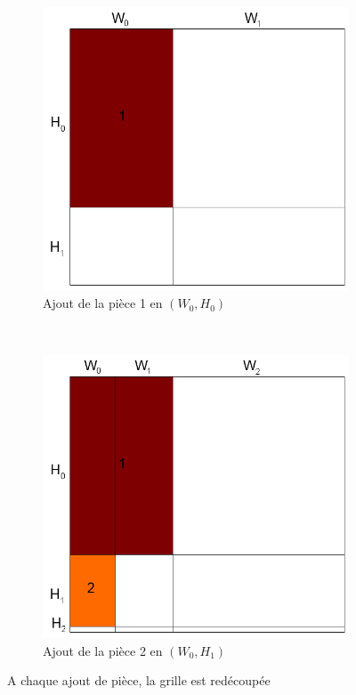 \begin{figure}[!htb]
    \centering
    \begin{subfigure}{.48\linewidth}
        \centering
        \includegraphics[width=\linewidth]{img/ScanlineC2.png}
        \caption{Ajout de la pièce 1 en $(W_0,H_0)$}
    \end{subfigure}%
    ~ 
    \begin{subfigure}{.48\linewidth}
        \centering
        \includegraphics[width=\linewidth]{img/ScanlineC3.png}
        \caption{Ajout de la pièce 2 en $(W_0,H_1)$}
    \end{subfigure}
    \caption{A chaque ajout de pièce, la grille est redécoupée}
    \label{fig:ScanlineC2-3}
\end{figure}

